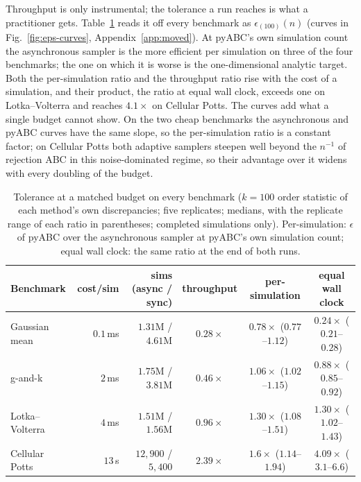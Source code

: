 \documentclass[10pt]{article}
\theoremstyle{plain}
\theoremstyle{definition}
\begin{document}
Throughput is only instrumental; the tolerance a run reaches is what a practitioner gets. Table~\ref{tab:matched-eps} reads it off every benchmark as $\epsilon_{(100)}(n)$ (curves in Fig.~\ref{fig:eps-curves}, Appendix~\ref{app:moved}). At pyABC's own simulation count the asynchronous sampler is the more efficient per simulation on three of the four benchmarks; the one on which it is worse is the one-dimensional analytic target. Both the per-simulation ratio and the throughput ratio rise with the cost of a simulation, and their product, the ratio at equal wall clock, exceeds one on Lotka--Volterra and reaches $4.1\times$ on Cellular Potts. The curves add what a single budget cannot show. On the two cheap benchmarks the asynchronous and pyABC curves have the same slope, so the per-simulation ratio is a constant factor; on Cellular Potts both adaptive samplers steepen well beyond the $n^{-1}$ of rejection ABC in this noise-dominated regime, so their advantage over it widens with every doubling of the budget.
\begin{table}[t]
\caption{Tolerance at a matched budget on every benchmark ($k=100$ order statistic of each method's own discrepancies; five replicates; medians, with the replicate range of each ratio in parentheses; completed simulations only). Per-simulation: $\epsilon$ of pyABC over the asynchronous sampler at pyABC's own simulation count; equal wall clock: the same ratio at the end of both runs.}\label{tab:matched-eps}
\centering
\footnotesize
\setlength{\tabcolsep}{4pt}
\begin{tabular}{@{}lrrccc@{}}
\toprule
Benchmark & cost/sim & sims (async / sync) & throughput & per-simulation & equal wall clock \\
\midrule
Gaussian mean   & $0.1$\,ms & $1.31$M / $4.61$M & $0.28\times$ & $0.78\times$ ($0.77$--$1.12$) & $0.24\times$ ($0.21$--$0.28$) \\
g-and-k         & $2$\,ms   & $1.75$M / $3.81$M & $0.46\times$ & $1.06\times$ ($1.02$--$1.15$) & $0.88\times$ ($0.85$--$0.92$) \\
Lotka--Volterra & $4$\,ms   & $1.51$M / $1.56$M & $0.96\times$ & $1.30\times$ ($1.08$--$1.51$) & $1.30\times$ ($1.02$--$1.43$) \\
Cellular Potts  & $13$\,s   & $12{,}900$ / $5{,}400$ & $2.39\times$ & $1.6\times$ ($1.14$--$1.94$) & $4.09\times$ ($3.1$--$6.6$) \\
\bottomrule
\end{tabular}
\end{table}
\end{document}

